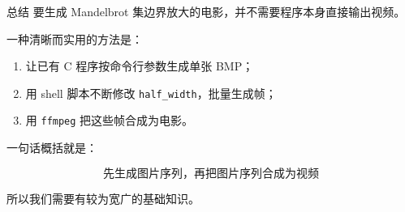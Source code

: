\documentclass[aspectratio=169,11pt]{ctexbeamer}
\begin{document}
\begin{frame}[fragile]{总结}
要生成 Mandelbrot 集边界放大的电影，并不需要程序本身直接输出视频。

\vspace{0.5em}
一种清晰而实用的方法是：

\begin{enumerate}
  \item 让已有 C 程序按命令行参数生成单张 BMP；
  \item 用 shell 脚本不断修改 \texttt{half\_width}，批量生成帧；
  \item 用 \texttt{ffmpeg} 把这些帧合成为电影。
\end{enumerate}

\vspace{0.8em}
一句话概括就是：

\[
\boxed{
\text{先生成图片序列，再把图片序列合成为视频}
}
\]

所以我们需要有较为宽广的基础知识。
\end{frame}
\end{document}
